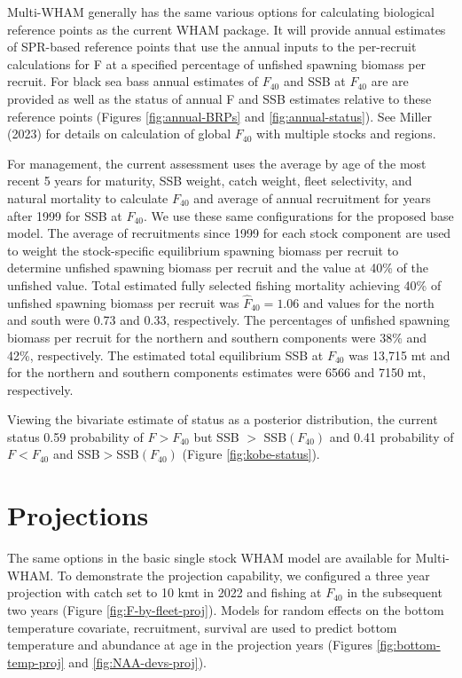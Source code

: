 \documentclass[
]{article}
\begin{document}
Multi-WHAM generally has the same various options for calculating biological reference points as the current WHAM package. It will provide annual estimates of SPR-based reference points that use the annual inputs to the per-recruit calculations for F at a specified percentage of unfished spawning biomass per recruit. For black sea bass annual estimates of \(F_{40}\) and SSB at \(F_{40}\) are are provided as well as the status of annual F and SSB estimates relative to these reference points (Figures \ref{fig:annual-BRPs} and \ref{fig:annual-status}). See Miller (2023) for details on calculation of global \(F_{40}\) with multiple stocks and regions.

For management, the current assessment uses the average by age of the most recent 5 years for maturity, SSB weight, catch weight, fleet selectivity, and natural mortality to calculate \(F_{40}\) and average of annual recruitment for years after 1999 for SSB at \(F_{40}\). We use these same configurations for the proposed base model. The average of recruitments since 1999 for each stock component are used to weight the stock-specific equilibrium spawning biomass per recruit to determine unfished spawning biomass per recruit and the value at 40\% of the unfished value. Total estimated fully selected fishing mortality achieving 40\% of unfished spawning biomass per recruit was \(\widehat F_{40}= 1.06\) and values for the north and south were 0.73 and 0.33, respectively. The percentages of unfished spawning biomass per recruit for the northern and southern components were 38\% and 42\%, respectively. The estimated total equilibrium SSB at \(F_{40}\) was 13,715 mt and for the northern and southern components estimates were 6566 and 7150 mt, respectively.

Viewing the bivariate estimate of status as a posterior distribution, the current status 0.59 probability of \(F>F_{40}\) but SSB \(>\) SSB\((F_{40})\) and 0.41 probability of \(F<F_{40}\) and SSB\(>\)SSB\((F_{40})\) (Figure \ref{fig:kobe-status}).

\hypertarget{projections}{%
\section{Projections}\label{projections}}

The same options in the basic single stock WHAM model are available for Multi-WHAM. To demonstrate the projection capability, we configured a three year projection with catch set to 10 kmt in 2022 and fishing at \(F_{40}\) in the subsequent two years (Figure \ref{fig:F-by-fleet-proj}). Models for random effects on the bottom temperature covariate, recruitment, survival are used to predict bottom temperature and abundance at age in the projection years (Figures \ref{fig:bottom-temp-proj} and \ref{fig:NAA-devs-proj}).
\end{document}
